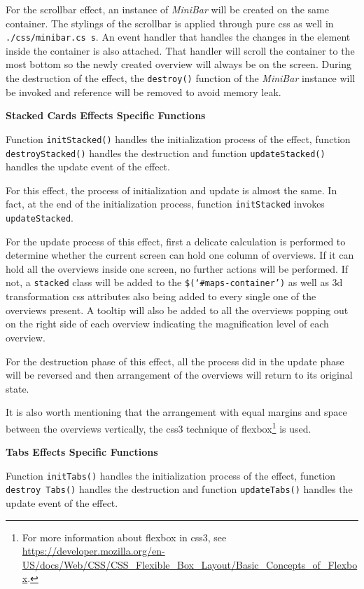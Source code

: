 For the scrollbar effect, an instance of \emph{MiniBar} will be created on the same container. The stylings of the scrollbar is applied through pure \gls{css} as well in \texttt{./css/minibar.cs s}. An event handler that handles the changes in the element inside the container is also attached. That handler will scroll the container to the most bottom so the newly created overview will always be on the screen. During the destruction of the effect, the \texttt{destroy()} function of the \emph{MiniBar} instance will be invoked and reference will be removed to avoid memory leak.

\textbf{Stacked Cards Effects Specific Functions}

Function \texttt{initStacked()} handles the initialization process of the effect, function \texttt{destroyStacked()} handles the destruction and function \texttt{updateStacked()} handles the update event of the effect.

For this effect, the process of initialization and update is almost the same. In fact, at the end of the initialization process, function \texttt{initStacked} invokes \texttt{updateStacked}.

For the update process of this effect, first a delicate calculation is performed to determine whether the current screen can hold one column of overviews. If it can hold all the overviews inside one screen, no further actions will be performed. If not, a \texttt{stacked} class will be added to the \texttt{\$(`\#maps-container')} as well as 3d transformation \gls{css} attributes also being added to every single one of the overviews present. A tooltip will also be added to all the overviews popping out on the right side of each overview indicating the magnification level of each overview.

For the destruction phase of this effect, all the process did in the update phase will be reversed and then arrangement of the overviews will return to its original state.

It is also worth mentioning that the arrangement with equal margins and space between the overviews vertically, the \gls{css3} technique of flexbox\footnote{ For more information about flexbox in \gls{css3}, see \url{https://developer.mozilla.org/en-US/docs/Web/CSS/CSS_Flexible_Box_Layout/Basic_Concepts_of_Flexbox}.} is used.

\textbf{Tabs Effects Specific Functions}

Function \texttt{initTabs()} handles the initialization process of the effect, function \texttt{destroy Tabs()} handles the destruction and function \texttt{updateTabs()} handles the update event of the effect.

